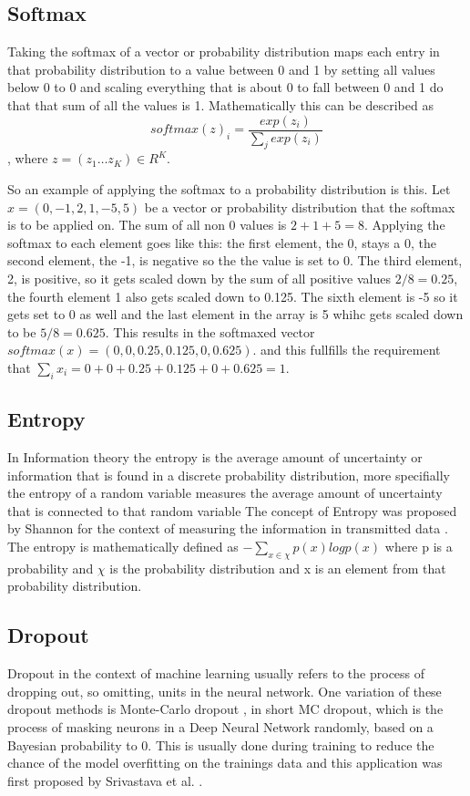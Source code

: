 \subsection{Softmax}
Taking the softmax of a vector or probability distribution maps each entry in that probability distribution to a value between 0 and 1 by setting all values below 0 to 0 and scaling everything that is about 0 to fall between 0 and 1 do that that sum of all the values is 1. 
Mathematically this can be described as $$softmax(z)_i=\frac{exp(z_i)}{\sum_j exp(z_i)}$$, where $z=(z_1\dots z_K)\in R^K$.

So an example of applying the softmax to a probability distribution is this. Let $x= (0, -1, 2, 1, -5, 5)$ be a vector or probability distribution that the softmax is to be applied on. The sum of all non 0 values is $2+1+5=8$. Applying the softmax to each element goes like this: the first element, the 0, stays a 0, the second element, the -1, is negative so the the value is set to 0. The third element, 2, is positive, so it gets scaled down by the sum of all positive values $2/8=0.25$, the fourth element 1 also gets scaled down to 0.125. The sixth element is -5 so it gets set to 0 as well and the last element in the array is 5 whihc gets scaled down to be $5/8=0.625$.
This results in the softmaxed vector $softmax(x)=(0,0,0.25,0.125,0,0.625)$. and this fullfills the requirement that $\sum_ix_i = 0+0+0.25+0.125+0+0.625= 1$. 

\subsection{Entropy}
\label{entropy}
In Information theory the entropy is the average amount of uncertainty or information that is found in a discrete probability distribution, more specifially the entropy of a random variable measures the average amount of uncertainty that is connected to that random variable 
The concept of Entropy was proposed by Shannon for the context of measuring the information in transmitted data \cite{shannonentropy}.
The entropy is mathematically defined as $- \sum_{x\in \chi} p(x) log p(x)$ where p is a probability and $\chi$ is the probability distribution and x is an element from that probability distribution.


\subsection{Dropout}
Dropout in the context of machine learning usually refers to the process of dropping out, so omitting, units in the neural network. 
One variation of these dropout methods is Monte-Carlo dropout \cite{gal2016dropoutbayesianapproximationrepresenting}, in short MC dropout, which is the process of masking neurons in a Deep Neural Network randomly, based on a Bayesian probability to 0. 
This is usually done during training to reduce the chance of the model overfitting on the trainings data and this application was first proposed by Srivastava et al. \cite{JMLR:v15:srivastava14a}. 

